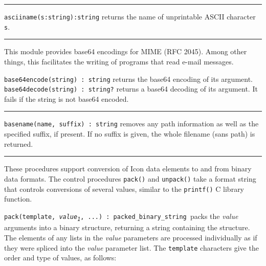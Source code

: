 \vspace{0.25cm}\hrule{}

\texttt{asciiname(s:string):string} returns the name of
unprintable ASCII character \texttt{s}.

\pagebreak

\vspace{0.25cm}\hrule{}

This module provides base64 encodings for MIME (RFC 2045).
Among other things, this facilitates the writing of programs that read
e-mail messages.

\texttt{base64encode(string) : string} returns the base64 encoding of
its argument.\\
\texttt{base64decode(string) : string?} returns a base64 decoding of its
argument. It fails if the string is not base64 encoded.

\vspace{0.25cm}\hrule{}

\texttt{basename}\texttt{(name, suffix) : string} removes
any path information as well as the specified suffix, if present.
If no suffix is given, the whole filename (sans path) is returned.

\vspace{0.25cm}\hrule{}

These procedures support conversion of Icon data elements
to and from binary data formats. The control procedures \texttt{pack()}
and \texttt{unpack()} take a format string that controls conversions of
several values, similar to the \texttt{printf()} C library function.

\texttt{pack(template,
}\texttt{\textit{value}}\texttt{\textit{\textsubscript{1}}}\texttt{,
...) : packed\_binary\_string}\texttt{ }packs the \textit{value}
arguments into a binary structure, returning a string containing the
structure. The elements of any lists in the \textit{value} parameters
are processed individually as if they were spliced into the
\textit{value} parameter list. The \texttt{template} characters give
the order and type of values, as follows:

